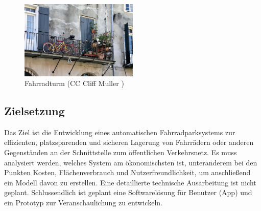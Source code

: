\begin{figure}[ht]
  \begin{center}
    \includegraphics[width=0.5\textwidth]{images/fahrrad_balkon.jpg}
    \caption{Fahrradturm (CC Cliff Muller \cite{cc})}
    \label{fig:fahrrad_balkon}
  \end{center}
\end{figure}

\subsection{Zielsetzung}
Das Ziel ist die Entwicklung eines automatischen Fahrradparksystems zur effizienten, platzsparenden und sicheren Lagerung von Fahrrädern oder anderen Gegenständen an der Schnittstelle zum öffentlichen Verkehrsnetz. Es muss analysiert werden, welches System am ökonomischsten ist, unteranderem bei den Punkten Kosten, Flächenverbrauch und Nutzerfreundlichkeit, um anschließend ein Modell davon zu erstellen. Eine detaillierte technische Ausarbeitung ist nicht geplant. Schlussendlich ist geplant eine Softwarelösung für Benutzer (App) und ein Prototyp zur Veranschaulichung zu entwickeln.